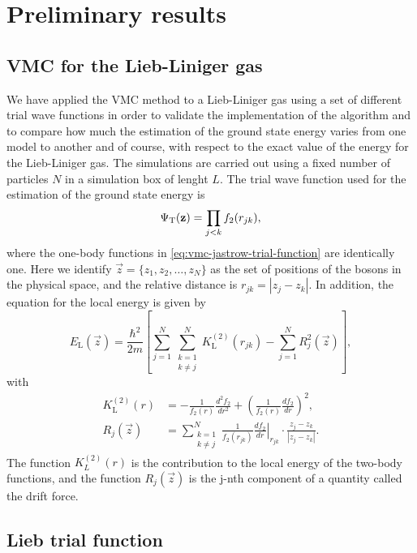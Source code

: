 \section{Preliminary results}

\subsection{VMC for the Lieb-Liniger gas}

We have applied the VMC method to a Lieb-Liniger gas using a set of different
trial wave functions in order to validate the implementation of the algorithm
and to compare how much the estimation of the ground state energy varies from
one model to another and of course, with respect to the exact value of the
energy for the Lieb-Liniger gas. The simulations are carried out using a fixed
number of particles $N$ in a simulation box of lenght $L$. The trial wave
function used for the estimation of the ground state energy is
%
\begin{equation}
	\Psi_{\mathrm{T}}(\mathbf z) = \prod_{j < k} f_2(r_{jk}),
\end{equation}
%
where the one-body functions in \eqref{eq:vmc-jastrow-trial-function} are
identically one. Here we identify $\vec z = \{z_1, z_2, \ldots, z_N \}$ as the
set of positions of the bosons in the physical space, and the relative distance
is $r_{jk} = |z_j - z_k|$. In addition, the equation for the local energy is
given by
%
\begin{equation}
	\label{eq:vmc-lieb-local-energy}
	E_{\mathrm{L}}(\vec z) = \frac{\hbar^2}{2m} \left[ \sum_{j=1}^{N}
	\sum_{\substack{k=1 \\ k \neq j}}^{N} K^{(2)}_{\mathrm{L}} (r_{jk}) -
	\sum_{j=1}^{N} R_{j}^2(\vec z)
	\right],
\end{equation}
%
with
%
\begin{align}
	K^{(2)}_{\mathrm{L}} (r) &= -\frac{1}{f_2(r)} \frac{d^2 f_2}{dr^2} +
	\left( \frac{1}{f_2(r)} \frac{df_2}{dr} \right)^2, \\
	R_{j}(\vec z) & = \sum_{\substack{k=1 \\ k \neq j}}^{N} \frac{1}{f_2(r_{jk})}
	\left. \frac{d f_2}{dr}  \right|_{r_{jk}} \cdot \frac{z_j - z_k}{|z_j - z_k|}.
\end{align}
%
The function $K_{L}^{(2)}(r)$ is the contribution to the local energy of the
two-body functions, and the function $R_{j}(\vec z)$ is the j-nth component of a
quantity called the drift force.


\subsection{Lieb trial function}

